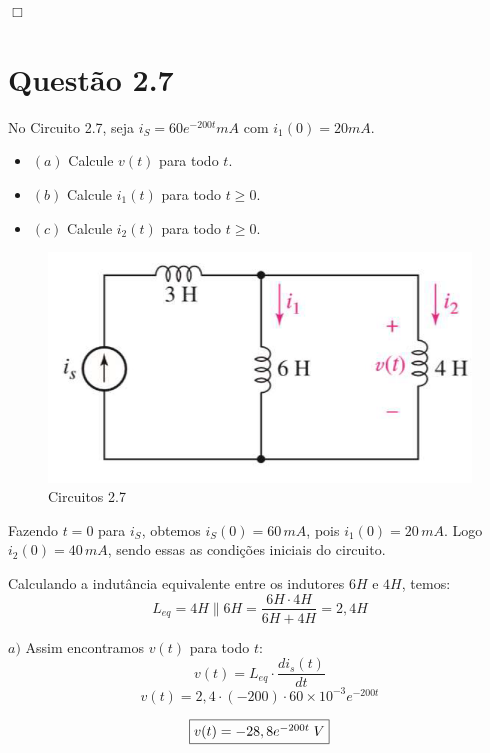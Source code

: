 \documentclass[
	12pt,				%
	oneside,			%
	a4paper,			%
	english,			%
	french,				%
	spanish,			%
	brazil				%
	]{abntex2}
\begin{document}
\begin{flushright}
    $\Box$
\end{flushright}
\newpage
\section*{Questão 2.7}
No Circuito 2.7, seja $i_S = 60e^{-200t} mA$ com $i_1(0)=20mA$.
\begin{itemize}
    \item $(a)$ Calcule $v(t)$ para todo $t$.
    \item $(b)$ Calcule $i_1(t)$ para todo $t\ge0$.
    \item $(c)$ Calcule $i_2(t)$ para todo $t\ge0$. 
\end{itemize}

\begin{figure}[htb]
	\centering
	\includegraphics[scale=0.5]{2-7.PNG}
	\caption{Circuitos 2.7}
\end{figure}

Fazendo $t=0$ para $i_S$, obtemos $i_S(0) = 60\,mA$, pois $i_1(0) = 20\,mA$. Logo $i_2(0) = 40\,mA$, sendo essas as condições iniciais do circuito.

Calculando a indutância equivalente entre os indutores $6H$ e $4H$, temos:
$$L_{eq} = 4H \parallel 6H = \dfrac{6H \cdot 4H}{6H + 4H} = 2,4 H$$

$a)$ Assim encontramos $v(t)$ para todo $t$:
$$v(t) = L_{eq} \cdot \dfrac{d i_s(t)}{dt}$$
$$v(t) = 2,4 \cdot (-200)\cdot 60 \times 10^{-3}e^{-200t}$$

\begin{equation}
    \fbox{$v(t) = -28,8e^{-200t}\;V$}
\end{equation}
\end{document}
